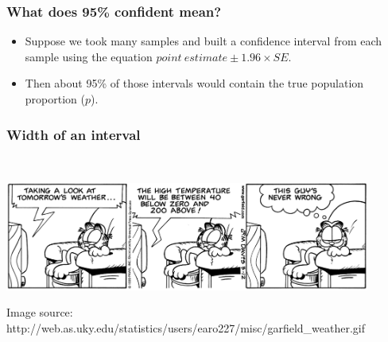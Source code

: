 \documentclass[notes,11pt, aspectratio=169]{beamer}
\begin{document}


\begin{frame}
\frametitle{What does 95\% confident mean?}

\begin{itemize}

\item Suppose we took many samples and built a confidence interval from each sample using the equation $point~estimate \pm 1.96 \times SE$.

\item Then about 95\% of those intervals would contain the true population proportion ($p$). 

\end{itemize}

\end{frame}


\begin{frame}
\frametitle{Width of an interval}


\pause


$\:$ \\

\pause

\begin{center}
\includegraphics[width=0.9\textwidth]{graphs/garfield}
\end{center}

\pause


{\scriptsize Image source: http://web.as.uky.edu/statistics/users/earo227/misc/garfield\_weather.gif}

\end{frame}
\end{document}
